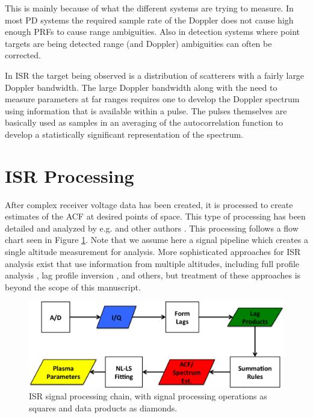 This is mainly because of what the different systems are trying to measure.  In most PD systems the required sample rate of the Doppler does not cause high enough PRFs to cause range ambiguities.  Also in detection systems where point targets are being detected range (and Doppler) ambiguities can often be corrected.

In ISR the target being observed is a distribution of scatterers with a fairly large Doppler bandwidth.  The large Doppler bandwidth along with the need to measure parameters at far ranges requires one to develop the Doppler spectrum using information that is available within a pulse.  The pulses themselves are basically used as samples in an averaging of the autocorrelation function to develop a statistically significant representation of the spectrum.


\section{ISR Processing}

After complex receiver voltage data has been created, it is processed to create estimates of the ACF at desired points of space. This type of processing has been detailed and analyzed by e.g. \cite{farley1969} and other authors \cite{nygren1996}. This processing follows a flow chart seen in Figure \ref{fig:chain}.  Note that we assume here a signal pipeline which creates a single altitude measurement for analysis.  More sophisticated approaches for ISR analysis exist that use information from multiple altitudes, including full profile analysis \cite{RDS:RDS3308}, lag profile inversion \cite{Virtanen:20082vx}, and others, but treatment of these approaches is beyond the scope of this manuscript.

\begin{figure}[!t]
\centering
\includegraphics[width=6in]{datastackchain}
\caption{ISR signal processing chain, with signal processing operations as squares and data products as diamonds.}
\label{fig:chain}
\end{figure}


